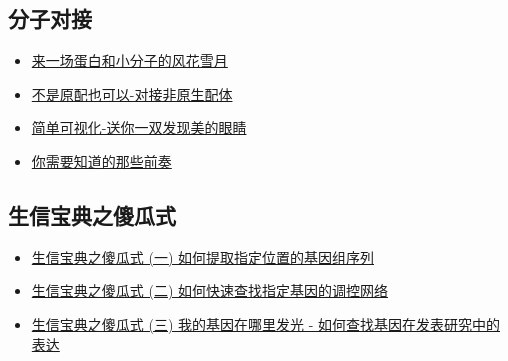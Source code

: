 \documentclass[]{article}
\providecommand{\tightlist}{%
  \setlength{\itemsep}{0pt}\setlength{\parskip}{0pt}}
\numberwithin{figure}{section}
\numberwithin{table}{section}
\theoremstyle{definition}
\theoremstyle{definition}
\theoremstyle{definition}
\theoremstyle{remark}
\begin{document}
\subsection{分子对接}

\begin{itemize}
\tightlist
\item
  \href{http://mp.weixin.qq.com/s?__biz=MzI5MTcwNjA4NQ==\&mid=2247483842\&idx=1\&sn=653e97fb32eaa73ce9f26b22306cc369\&chksm=ec0dc448db7a4d5ef15d62d62df9e3a243a7e304c816c2a6ac3f878b07ede52010900e7c9136\#rd}{来一场蛋白和小分子的风花雪月}
\item
  \href{http://mp.weixin.qq.com/s?__biz=MzI5MTcwNjA4NQ==\&mid=2247483842\&idx=3\&sn=caa5bb8ab6c868b8644c5f532b12adf2\&chksm=ec0dc448db7a4d5e9827d5419b08a8930b27c53d80d21c207f15be3a27eedc6fa1088de709f7\#rd}{不是原配也可以-对接非原生配体}
\item
  \href{http://mp.weixin.qq.com/s?__biz=MzI5MTcwNjA4NQ==\&mid=2247483842\&idx=2\&sn=c3c3f80b2e24ee5287678e4a853fb657\&chksm=ec0dc448db7a4d5e3a023a2067552d29ee5fca143192771d8d8570f9c9c8f65b13829360f487\#rd}{简单可视化-送你一双发现美的眼睛}
\item
  \href{http://mp.weixin.qq.com/s?__biz=MzI5MTcwNjA4NQ==\&mid=2247483842\&idx=4\&sn=8b7918a98e5e34f78263f248620d8311\&chksm=ec0dc448db7a4d5ec2a83703149caed48fa5afbe4822e855785448008e34a9991d9f428d8fec\#rd}{你需要知道的那些前奏}
\end{itemize}

\subsection{生信宝典之傻瓜式}

\begin{itemize}
\tightlist
\item
  \href{http://mp.weixin.qq.com/s?__biz=MzI5MTcwNjA4NQ==\&mid=2247484030\&idx=1\&sn=0d369c99fd49ebafefe60c00efe647b1\&chksm=ec0dc7f4db7a4ee241beb0fb8a3e5d8bf7e9ac69899db9b6b6522093bda21e5a2202ddf1edda\#rd}{生信宝典之傻瓜式
  (一) 如何提取指定位置的基因组序列}
\item
  \href{http://mp.weixin.qq.com/s?__biz=MzI5MTcwNjA4NQ==\&mid=2247483852\&idx=1\&sn=d419fa404b987b4d70f789eb2de8478c\&chksm=ec0dc446db7a4d50e4700d88f42d3991ea622a058f1529586b533648dcee994e08f742133abe\#rd}{生信宝典之傻瓜式
  (二) 如何快速查找指定基因的调控网络}
\item
  \href{http://mp.weixin.qq.com/s?__biz=MzI5MTcwNjA4NQ==\&mid=2247483864\&idx=1\&sn=c1df1a797a4c2e4cf5f0e0524664bebd\&chksm=ec0dc452db7a4d44a97031725ae4630bdbec7e37076144d60dfd83e17d04cd8a7003f039ecc0\#rd}{生信宝典之傻瓜式
  (三) 我的基因在哪里发光 - 如何查找基因在发表研究中的表达}
\end{itemize}
\end{document}
